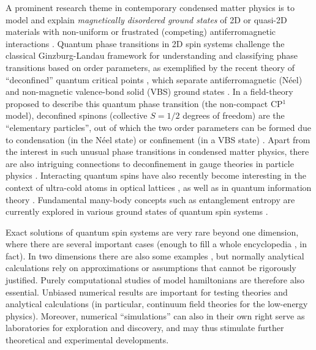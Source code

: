 \documentclass[draft,numberedheadings]{aipproc}
\begin{document}
A prominent research theme in contemporary condensed matter physics is to model and explain {\it magnetically disordered ground states} of 2D or 
quasi-2D materials with non-uniform or frustrated (competing) antiferromagnetic interactions \cite{schollwock1,diep,gardner,balents10}. Quantum phase 
transitions in 2D spin systems challenge the classical Ginzburg-Landau framework \cite{cardy} for understanding and classifying phase transitions 
based on order parameters, as exemplified by the recent theory of ``deconfined'' quantum critical points \cite{sachdev1,senthil1}, which separate 
antiferromagnetic (N\'eel) and non-magnetic valence-bond solid (VBS) ground states \cite{sandvik1}. In a field-theory proposed to describe this quantum 
phase transition (the non-compact CP$^1$ model), deconfined spinons (collective $S=1/2$ degrees of freedom) are the ``elementary particles'', out of 
which the two order parameters can be formed due to condensation (in the N\'eel state) or confinement (in a VBS state) \cite{senthil1}. Apart from 
the interest in such unusual phase transitions in condensed matter physics, there are also intriguing connections to deconfinement in gauge theories 
in particle physics \cite{sachdev3}. Interacting quantum spins have also recently become interesting in the context of ultra-cold atoms in optical 
lattices \cite{bloch,kim10}, as well as in quantum information theory \cite{verstraete1}. Fundamental many-body concepts such as entanglement 
entropy \cite{levin} are currently explored in various ground states of quantum spin systems \cite{hastings1}.

Exact solutions of quantum spin systems are very rare beyond one dimension, where there are several important cases (enough to fill
a whole encyclopedia \cite{lieb}, in fact). In two dimensions there are also some examples \cite{shastry,aklt}, but normally analytical 
calculations rely on approximations or assumptions that cannot be rigorously justified. Purely computational studies of model hamiltonians
are therefore also essential. Unbiased numerical results are important for testing theories and analytical calculations (in particular, continuum 
field theories for the low-energy physics). Moreover, numerical ``simulations'' can also in their own right serve as laboratories for exploration
and discovery, and may thus stimulate further theoretical and experimental developments. 
\end{document}
